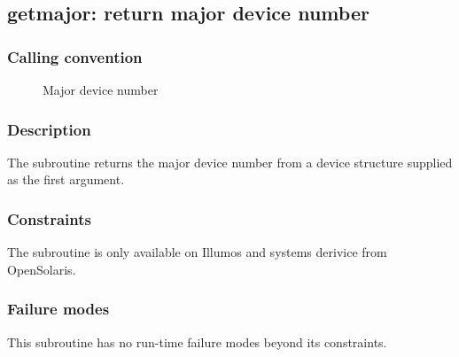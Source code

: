 \clearpage
{}
{}
\label{subr:getmajor}
\subsection*{getmajor: return major device number}

\subsubsection*{Calling convention}

\begin{description}
\item[] Major device number
\end{description}

\subsubsection*{Description}

The  subroutine returns the major device number
from a device structure supplied as the first argument.

\subsubsection*{Constraints}

The  subroutine is only available on Illumos and
systems derivice from OpenSolaris.

\subsubsection*{Failure modes}

This subroutine has no run-time failure modes beyond its constraints.
